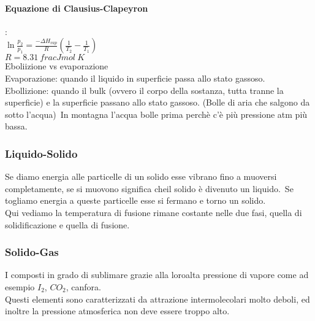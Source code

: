 \paragraph*{Equazione di Clausius-Clapeyron}:\\
$\ln\frac{p_2}{p_1}=\frac{-\Delta H_{vap}}{R}\left(\frac{1}{T_2}-\frac{1}{T_1}\right)$\\
$R = 8.31\ frac{J}{mol\ K}$\\
Eboliizione vs evaporazione\\
Evaporazione: quando il liquido in superficie passa allo stato gassoso.\\
Ebollizione: quando il bulk (ovvero il corpo della sostanza, tutta tranne la superficie) e la superficie passano allo stato gassoso. (Bolle di aria che salgono da sotto l'acqua)\
In montagna l'acqua bolle prima perchè c'è più pressione atm più bassa.
\subsubsection{Liquido-Solido}
Se diamo energia alle particelle di un solido esse vibrano fino a muoversi completamente, se si muovono significa cheil solido è divenuto un liquido.\
Se togliamo energia a queste particelle esse si fermano e torno un solido.\\
Qui vediamo la temperatura di fusione rimane costante nelle due fasi, quella di solidificazione e quella di fusione.
\subsubsection{Solido-Gas}
I composti in grado di sublimare grazie alla loroalta pressione di vapore come ad esempio $I_2$, $CO_2$, canfora.\\
Questi elementi sono caratterizzati da attrazione intermolecolari molto deboli, ed inoltre la pressione atmosferica non deve essere troppo alto.\\
